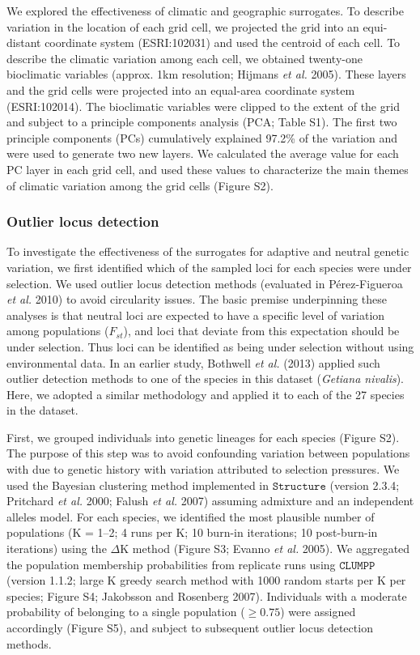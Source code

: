 \documentclass[11pt,]{article}
\begin{document}
We explored the effectiveness of climatic and geographic surrogates. To
describe variation in the location of each grid cell, we projected the
grid into an equi-distant coordinate system (ESRI:102031) and used the
centroid of each cell. To describe the climatic variation among each
cell, we obtained twenty-one bioclimatic variables (approx. 1km
resolution; Hijmans \emph{et al.} 2005). These layers and the grid cells
were projected into an equal-area coordinate system (ESRI:102014). The
bioclimatic variables were clipped to the extent of the grid and subject
to a principle components analysis (PCA; Table S1). The first two
principle components (PCs) cumulatively explained 97.2\% of the
variation and were used to generate two new layers. We calculated the
average value for each PC layer in each grid cell, and used these values
to characterize the main themes of climatic variation among the grid
cells (Figure S2).

\subsubsection{Outlier locus detection}\label{outlier-locus-detection}

To investigate the effectiveness of the surrogates for adaptive and
neutral genetic variation, we first identified which of the sampled loci
for each species were under selection. We used outlier locus detection
methods (evaluated in P{é}rez-Figueroa \emph{et al.} 2010) to avoid
circularity issues. The basic premise underpinning these analyses is
that neutral loci are expected to have a specific level of variation
among populations ($F_{st}$), and loci that deviate from this
expectation should be under selection. Thus loci can be identified as
being under selection without using environmental data. In an earlier
study, Bothwell \emph{et al.} (2013) applied such outlier detection
methods to one of the species in this dataset (\emph{Getiana nivalis}).
Here, we adopted a similar methodology and applied it to each of the 27
species in the dataset.

First, we grouped individuals into genetic lineages for each species
(Figure S2). The purpose of this step was to avoid confounding variation
between populations with due to genetic history with variation
attributed to selection pressures. We used the Bayesian clustering
method implemented in $\texttt{Structure}$ (version 2.3.4; Pritchard
\emph{et al.} 2000; Falush \emph{et al.} 2007) assuming admixture and an
independent alleles model. For each species, we identified the most
plausible number of populations (K = 1--2; 4 runs per K; 10 burn-in
iterations; 10 post-burn-in iterations) using the $\Delta$K method
(Figure S3; Evanno \emph{et al.} 2005). We aggregated the population
membership probabilities from replicate runs using $\texttt{CLUMPP}$
(version 1.1.2; large K greedy search method with 1000 random starts per
K per species; Figure S4; Jakobsson and Rosenberg 2007). Individuals
with a moderate probability of belonging to a single population
($\geq 0.75$) were assigned accordingly (Figure S5), and subject to
subsequent outlier locus detection methods.
\end{document}
